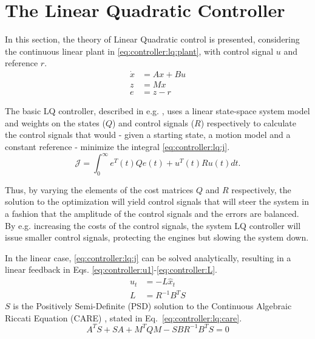 \section{The Linear Quadratic Controller}
\label{sec:controller:lq}
    In this section, the theory of Linear Quadratic control is presented,
    considering the continuous linear plant in \eqref{eq:controller:lq:plant},
    with control signal $u$ and reference $r$.
    \begin{subequations}
        \label{eq:controller:lq:plant}
        \begin{align}
            \dot{x} &= Ax + Bu \\
%
            z &= Mx \\
%
            e &= z - r
        \end{align}
    \end{subequations}

    The basic LQ controller, described in e.g. \citep{glad2003reglerteori},
    uses a linear state-space system model and weights on the states ($Q$) and control
    signals ($R$) respectively to calculate the control signals that would
    - given a starting state, a motion model and a constant reference -
    minimize the integral \eqref{eq:controller:lq:j}.
    \begin{equation}
    \label{eq:controller:lq:j}
        \mathcal{J} = \int_{0}^{\infty} e^{T}(t)Qe(t) + u^{T}(t)Ru(t) dt.
    \end{equation}

    Thus, by varying the elements of the cost matrices $Q$ and $R$
    respectively, the solution to the optimization will yield control
    signals that will steer the system in a fashion that the amplitude
    of the control signals and the errors are balanced.
    By e.g. increasing the costs of the control signals, the system
    LQ controller will issue smaller control signals, protecting the
    engines but slowing the system down.

    In the linear case, \eqref{eq:controller:lq:j} can be solved analytically,
    resulting in a linear feedback in Eqs. \eqref{eq:controller:u1}-\eqref{eq:controller:L}.
    \begin{align}
        u_{t} &= -L\hat{x}_{t} \label{eq:controller:u1} \\
%
        L &= R^{-1}B^{T}S \label{eq:controller:L}
    \end{align}
    $S$ is the Positively Semi-Definite (PSD) solution to the
    Continuous Algebraic Riccati Equation (CARE) \citep{glad2003reglerteori},
    stated in Eq.~\eqref{eq:controller:lq:care}.
    \begin{equation}
        \label{eq:controller:lq:care}
        A^{T}S + SA + M^{T}QM - SBR^{-1}B^{T}S = 0
    \end{equation}

